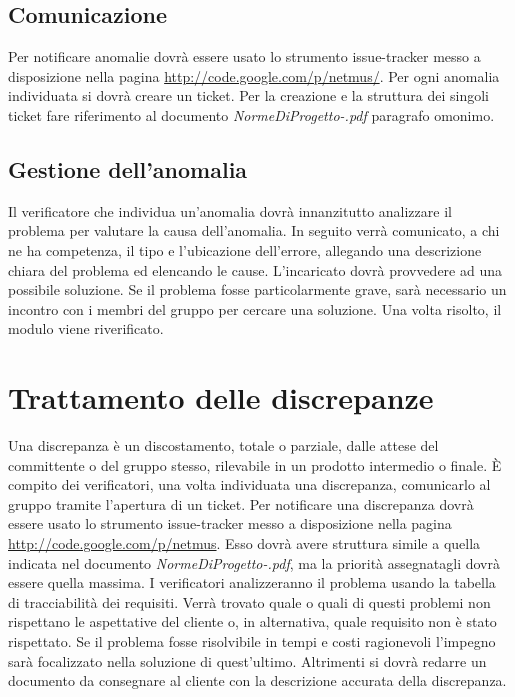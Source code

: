 \subsection{Comunicazione}

Per notificare anomalie dovr\`a essere usato lo strumento issue-tracker messo a
disposizione nella pagina \url{http://code.google.com/p/netmus/}. Per ogni
anomalia individuata si dovr\`a creare un ticket. Per la creazione e la struttura dei
singoli ticket fare riferimento al documento \emph{NormeDiProgetto-\versionenormeprogetto.pdf} paragrafo omonimo.


\subsection{Gestione dell'anomalia}

Il verificatore che individua un'anomalia dovr\`a innanzitutto analizzare il
problema per valutare la causa dell'anomalia.
In seguito verr\`a comunicato, a chi ne ha competenza, il tipo e l'ubicazione
dell'errore, allegando una descrizione chiara del problema ed elencando le
cause. L'incaricato dovr\`a provvedere ad una possibile soluzione. Se il
problema fosse particolarmente grave, sar\`a necessario un incontro con i membri 
del gruppo per cercare una soluzione. Una volta risolto, il modulo viene
riverificato.

\section{Trattamento delle discrepanze}

Una discrepanza \`e un discostamento, totale o parziale, dalle attese del
committente o del gruppo stesso, rilevabile in un prodotto intermedio
o finale. \`E compito dei verificatori, una volta individuata una discrepanza,
comunicarlo al gruppo tramite l'apertura di un ticket. Per notificare una
discrepanza dovr\`a essere usato lo strumento issue-tracker messo a disposizione nella pagina \url{http://code.google.com/p/netmus}. 
Esso dovr\`a avere struttura simile a quella indicata nel
documento \emph{NormeDiProgetto-\versionenormeprogetto.pdf}, ma la priorit\`a assegnatagli dovr\`a essere quella
massima. I verificatori analizzeranno il problema usando la tabella di
tracciabilit\`a dei requisiti. Verr\`a trovato quale o quali di questi problemi non
rispettano le aspettative del cliente o, in alternativa, quale requisito non \`e
stato rispettato. Se il problema fosse risolvibile in tempi e costi ragionevoli
l'impegno sar\`a focalizzato nella soluzione di quest'ultimo. Altrimenti si dovr\`a
redarre un documento da consegnare al cliente con la descrizione accurata della
discrepanza.\\

